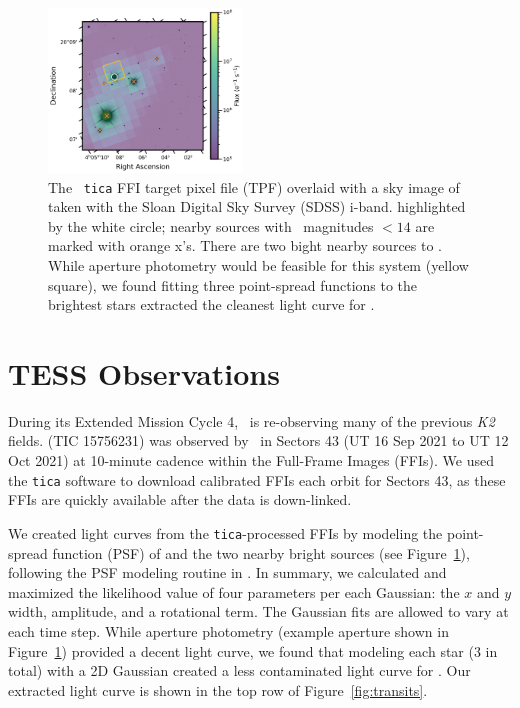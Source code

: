 \documentclass[twocolumn]{aastex631}
\begin{document}
\begin{figure}[!ht]
\begin{center}
\includegraphics[width=0.46\textwidth,trim={0.25cm 0 0 0}]{static/TESSaperture.pdf}
\caption{The \tess\ \texttt{tica} FFI target pixel file (TPF) overlaid with a sky image of \sname taken with the Sloan Digital Sky Survey (SDSS) i-band. \sname highlighted by the white circle; nearby sources with \tess\ magnitudes $< 14$ are marked with orange x's. There are two bight nearby sources to \sname. While aperture photometry would be feasible for this system (yellow square), we found fitting three point-spread functions to the brightest stars extracted the cleanest light curve for \sname. \href{https://github.com/afeinstein20/v1298tau_tess/blob/main/src/figures/tpf.py}{\github}} \label{fig:tpf}
\end{center}
\end{figure}

\section{TESS Observations} \label{sec:observations}

During its Extended Mission Cycle 4, \tess\ is re-observing many of the previous \textit{K2} fields. \sname (TIC 15756231) was observed by \tess\ in Sectors 43 (UT 16 Sep 2021 to UT 12 Oct 2021) at 10-minute cadence within the Full-Frame Images (FFIs). We used the \texttt{tica} \citep{fausnaugh20} software to download calibrated FFIs each orbit for Sectors 43, as these FFIs are quickly available after the data is down-linked. 

We created light curves from the \texttt{tica}-processed FFIs by modeling the point-spread function (PSF) of \sname and the two nearby bright sources (see Figure~\ref{fig:tpf}), following the PSF modeling routine in \cite{feinstein19}. In summary, we calculated and maximized the likelihood value of four parameters per each Gaussian: the $x$ and $y$ width, amplitude, and a rotational term. The Gaussian fits are allowed to vary at each time step. While aperture photometry (example aperture shown in Figure~\ref{fig:tpf}) provided a decent light curve, we found that modeling each star (3 in total) with a 2D Gaussian created a less contaminated light curve for \sname. Our extracted light curve is shown in the top row of Figure~\ref{fig:transits}.
\end{document}
